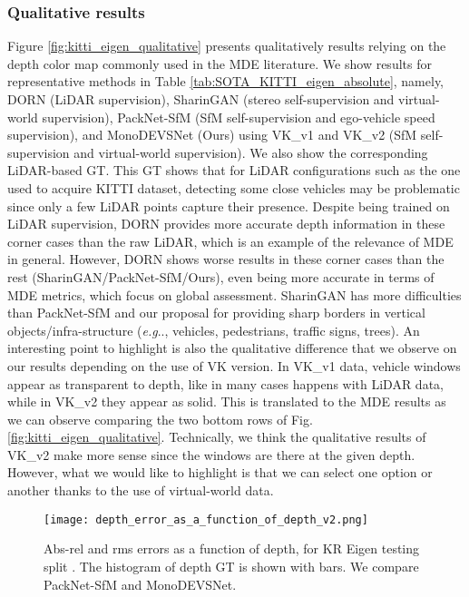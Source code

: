 \documentclass[journal]{IEEEtran}
\makeatletter
\DeclareRobustCommand\onedot{\futurelet\@let@token\@onedot}
\def\@onedot{\ifx\@let@token.\else.\null\fi\xspace}
\def\eg{\emph{e.g}\onedot} \def\Eg{\emph{E.g}\onedot}
\newcommand{\Fig}[1]{Fig. \ref{fig:#1}}
\newcommand{\Tab}[1]{Table \ref{tab:#1}}
\makeatother
\begin{document}
\subsubsection{Qualitative results}
Figure \ref{fig:kitti_eigen_qualitative} presents qualitatively results relying on the depth color map commonly used in the MDE literature. We show results for representative methods in \Tab{SOTA_KITTI_eigen_absolute}, namely, DORN (LiDAR supervision), SharinGAN (stereo self-supervision and virtual-world supervision), PackNet-SfM (SfM self-supervision and ego-vehicle speed supervision), and MonoDEVSNet (Ours) using VK\_v1 and VK\_v2 (SfM self-supervision and virtual-world supervision). We also show the corresponding LiDAR-based GT. This GT shows that for LiDAR configurations such as the one used to acquire KITTI dataset, detecting some close vehicles may be problematic since only a few LiDAR points capture their presence. Despite being trained on LiDAR supervision, DORN provides more accurate depth information in these corner cases than the raw LiDAR, which is an example of the relevance of MDE in general. However, DORN shows worse results in these corner cases than the rest (SharinGAN/PackNet-SfM/Ours), even being more accurate in terms of MDE metrics, which focus on global assessment. SharinGAN has more difficulties than PackNet-SfM and our proposal for providing sharp borders in vertical objects/infra-structure ({\eg}, vehicles, pedestrians, traffic signs, trees). An interesting point to highlight is also the qualitative difference that we observe on our results depending on the use of VK version. In VK\_v1 data, vehicle windows appear as transparent to depth, like in many cases happens with LiDAR data, while in VK\_v2 they appear as solid. This is translated to the MDE results as we can observe comparing the two bottom rows of \Fig{kitti_eigen_qualitative}. Technically, we think the qualitative results of VK\_v2 make more sense since the windows are there at the given depth. However, what we would like to highlight is that we can select one option or another thanks to the use of virtual-world data. 

\begin{figure}
    \centering
    \texttt{[image: depth\_error\_as\_a\_function\_of\_depth\_v2.png]}
    \caption{Abs-rel and rms errors as a function of depth, for KR Eigen testing split \cite{Eigen:2014}. The histogram of depth GT is shown with bars. We compare PackNet-SfM and MonoDEVSNet.}
    \label{fig:depth_error_as_a_function_of_depth}
\end{figure}
\end{document}
